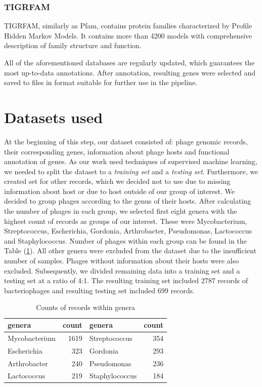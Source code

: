 \subsubsection{TIGRFAM}
TIGRFAM, similarly as Pfam, contains protein families characterized by Profile Hidden Markov Models.
It contains more than 4200 models with comprehensive description of family structure and function.

\vspace{\baselineskip}

All of the aforementioned databases are regularly updated, which guarantees the most up-to-data annotations.
After annotation, resulting genes were selected and saved to files in format suitable for further use in the pipeline.

\section{Datasets used}
At the beginning of this step, our dataset consisted of: phage genomic records, their corresponding genes, information about phage hosts and functional annotation of genes.
As our work used techniques of supervised machine learning, we needed to split the dataset to a \emph{training set} and a \emph{testing set}.
Furthermore, we created set for other records, which we decided not to use due to missing information about host or due to host outside of our group of interest.
We decided to group phages according to the genus of their hosts.
After calculating the number of phages in each group, we selected first eight genera with the highest count of records as groups of our interest.
These were Mycobacterium, Streptococcus, Escherichia, Gordonia, Arthrobacter, Pseudomonas, Lactococcus and Staphylococcus.
Number of phages within each group can be found in the Table (\ref{tab:counts}).
All other genera were excluded from the dataset due to the insufficient number of samples.
Phages without information about their hosts were also excluded.
Subsequently, we divided remaining data into a training set and a testing set at a ratio of 4:1.
The resulting training set included 2787 records of bacteriophages and resulting testing set included 699 records.

\begin{table}
 \centering
        \begin{tabular}{ l  r  l  r }
         \hline
         genera & count & genera & count \\
         \hline
         Mycobacterium & 1619 & Streptococcus & 354 \\
         Escherichia & 323 & Gordonia & 293 \\
         Arthrobacter & 240 & Pseudomonas & 236 \\
         Lactococcus & 219 & Staphylococcus & 184 \\
         \hline
        \end{tabular}
        \caption{Counts of records within genera}
        \label{tab:counts}
\end{table}

